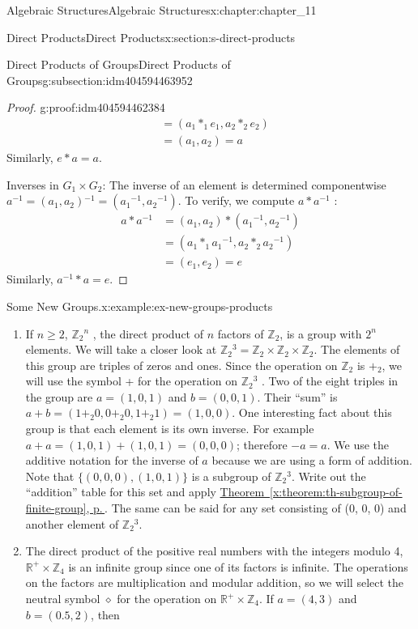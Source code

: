 \documentclass[twoside,10pt,]{book}
\newcommand{\xreffont}{\relax}
\numberwithin{equation}{section}
\begin{document}
\begin{chapterptx}{Algebraic Structures}{}{Algebraic Structures}{}{}{x:chapter:chapter_11}
\begin{sectionptx}{Direct Products}{}{Direct Products}{}{}{x:section:s-direct-products}
\begin{subsectionptx}{Direct Products of Groups}{}{Direct Products of Groups}{}{}{g:subsection:idm404594463952}
\begin{proof}{}{g:proof:idm404594462384}
\begin{equation*}
\begin{split}
& = \left(a_1*_1e_1,a_2*_2 e _2\right)\\
& = \left(a_1,a_2\right) = a
\end{split}
\end{equation*}
Similarly, \(e * a = a\).%
\par
Inverses in \(G_1\times G_2\): The inverse of an element is determined componentwise \(a^{-1}= \left(a_1,a_2\right){}^{-1}=\left(a_1{}^{-1},a_2{}^{-1}\right)\). To verify, we compute \(a * a^{-1}\) :%
\begin{equation*}
\begin{split}
a * a^{-1} &=\left(a_1,a_2\right)*\left(a_1{}^{-1},a_2{}^{-1}\right)\\
& =\left(a_1*_1a_1{}^{-1},a_2*_2a_2{}^{-1}\right)\\
& = \left(e_1, e _2 \right) =e
\end{split}
\end{equation*}
Similarly, \(a^{-1} * a=e\).%
\end{proof}
\begin{example}{Some New Groups.}{x:example:ex-new-groups-products}%
%
\begin{enumerate}[label=(\alph*)]
\item{}If \(n \geq  2\), \(\mathbb{Z}_2{}^n\) , the direct product of \(n\) factors of \(\mathbb{Z}_2\), is a group with \(2^n\) elements. We will take a closer look at \(\mathbb{Z}_2{}^3 = \mathbb{Z}_2 \times  \mathbb{Z}_2 \times  \mathbb{Z}_2\). The elements of this group are triples of zeros and ones. Since the operation on \(\mathbb{Z}_2\) is \(+_2\), we will use the symbol + for the operation on \(\mathbb{Z}_2{}^3\) . Two of the eight triples in the group are \(a = (1, 0, 1)\) and \(b = (0, 0, 1)\). Their ``sum'' is \(a + b = \left(1 +_2 0, 0 +_2 0, 1 +_2 1\right)
= (1, 0, 0)\). One interesting fact about this group is that each element is its own inverse. For example \(a + a = (1, 0, 1) + (1, 0, 1) = (0, 0,
0)\); therefore \(-a = a\). We use the additive notation for the inverse of \(a\) because we are using a form of addition. Note that \(\{(0, 0, 0), (1,
0, 1)\}\) is a subgroup of \(\mathbb{Z}_2{}^3\). Write out the ``addition'' table for this set and apply \hyperref[x:theorem:th-subgroup-of-finite-group]{Theorem~{\xreffont\ref{x:theorem:th-subgroup-of-finite-group}}, p.\,\pageref{x:theorem:th-subgroup-of-finite-group}}. The same can be said for any set consisting of (0, 0, 0) and another element of \(\mathbb{Z}_2{}^3\).%
\item{}The direct product of the positive real numbers with the integers modulo 4, \(\mathbb{R}^+ \times  \mathbb{Z}_4\) is an infinite group since one of its factors is infinite. The operations on the factors are multiplication and modular addition, so we will select the neutral symbol \(\diamond\) for the operation on \(\mathbb{R}^+ \times  \mathbb{Z}_4\). If \(a = (4, 3)\) and \(b = (0.5, 2)\), then%

\end{enumerate}
\end{example}
\end{subsectionptx}
\end{sectionptx}
\end{chapterptx}
\end{document}
